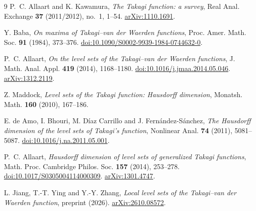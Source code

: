 \documentclass[11pt]{article}
\theoremstyle{definition}
\theoremstyle{remark}
\begin{document}
\begin{thebibliography}{9}
P.~C. Allaart and K. Kawamura,
\emph{The Takagi function: a survey},
Real Anal. Exchange \textbf{37} (2011/2012), no.~1, 1--54.
\href{https://arxiv.org/abs/1110.1691}{arXiv:1110.1691}.

Y. Baba,
\emph{On maxima of Takagi--van der Waerden functions},
Proc. Amer. Math. Soc. \textbf{91} (1984), 373--376.
\href{https://doi.org/10.1090/S0002-9939-1984-0744632-0}{doi:10.1090/S0002-9939-1984-0744632-0}.

P.~C. Allaart,
\emph{On the level sets of the Takagi--van der Waerden functions},
J. Math. Anal. Appl. \textbf{419} (2014), 1168--1180.
\href{https://doi.org/10.1016/j.jmaa.2014.05.046}{doi:10.1016/j.jmaa.2014.05.046}.
\href{https://arxiv.org/abs/1312.2119}{arXiv:1312.2119}.

Z. Maddock,
\emph{Level sets of the Takagi function: Hausdorff dimension},
Monatsh. Math. \textbf{160} (2010), 167--186.

E. de Amo, I. Bhouri, M. D\'iaz Carrillo and J. Fern\'andez-S\'anchez,
\emph{The Hausdorff dimension of the level sets of Takagi's function},
Nonlinear Anal. \textbf{74} (2011), 5081--5087.
\href{https://doi.org/10.1016/j.na.2011.05.001}{doi:10.1016/j.na.2011.05.001}.

P.~C. Allaart,
\emph{Hausdorff dimension of level sets of generalized Takagi functions},
Math. Proc. Cambridge Philos. Soc. \textbf{157} (2014), 253--278.
\href{https://doi.org/10.1017/S0305004114000309}{doi:10.1017/S0305004114000309}.
\href{https://arxiv.org/abs/1301.4747}{arXiv:1301.4747}.

L. Jiang, T.-T. Ying and Y.-Y. Zhang,
\emph{Local level sets of the Takagi--van der Waerden function},
preprint (2026).
\href{https://arxiv.org/abs/2610.08572}{arXiv:2610.08572}.
\end{thebibliography}
\end{document}
